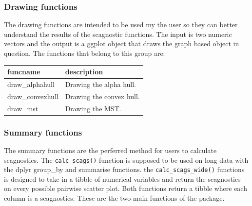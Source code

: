 \hypertarget{drawing-functions}{%
\subsubsection{Drawing functions}\label{drawing-functions}}

The drawing functions are intended to be used my the user so they can
better understand the results of the scagnostic functions. The input is
two numeric vectors and the output is a ggplot object that draws the
graph based object in question. The functions that belong to this group
are:

\begin{Schunk}

\begin{tabular}{l|l}
\hline
funcname & description\\
\hline
draw\_alphahull & Drawing the alpha hull.\\
\hline
draw\_convexhull & Drawing the convex hull.\\
\hline
draw\_mst & Drawing the MST.\\
\hline
\end{tabular}

\end{Schunk}

\hypertarget{summary-functions}{%
\subsubsection{Summary functions}\label{summary-functions}}

The summary functions are the perferred method for users to calculate
scagnostics. The \texttt{calc\_scags()} function is supposed to be used
on long data with the dplyr group\_by and summarise functions. the
\texttt{calc\_scags\_wide()} functions is designed to take in a tibble
of numerical variables and return the scagnostics on every possible
pairwise scatter plot. Both functions return a tibble where each column
is a scagnostics. These are the two main functions of the package.

